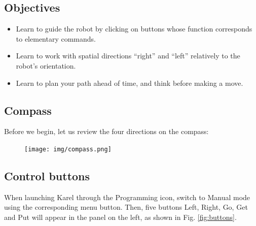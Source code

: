 \subsection{Objectives} 
\begin{itemize}
\item Learn to guide the robot by clicking on buttons whose function corresponds to elementary commands.
\item Learn to work with spatial directions ``right'' and ``left'' relatively to the robot's orientation. 
\item Learn to plan your path ahead of time, and think before making a move.
\end{itemize}

\subsection{Compass}

Before we begin, let us review the four directions on the compass:
\newpage

\begin{figure}[!ht]
\begin{center}
\texttt{[image: img/compass.png]}
\vspace{-0mm}
\end{center}
\vspace{-1cm}
\end{figure}

\subsection{Control buttons}

When launching Karel through the Programming icon, switch to Manual mode using the corresponding 
menu button. Then, five buttons Left, Right, Go, Get and Put will appear in the panel on the left,
as shown in Fig. \ref{fig:buttons}.

